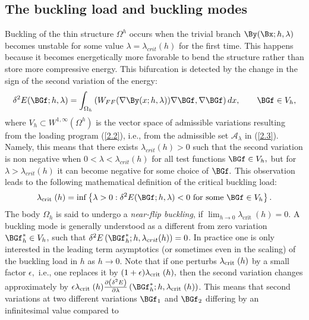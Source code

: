 \subsection{The buckling load and buckling modes}


Buckling of the thin structure $\Omega^h$ occurs when the trivial branch $\By(\Bx ; h, \lambda)$ becomes unstable for some value $\lambda=\lambda_{crit}(h)$ for the first time. This happens because it becomes energetically more favorable to bend the structure rather than store more compressive energy. This bifurcation is detected by the change in the sign of the second variation of the energy:
\begin{equation}
\label{2.6}
\delta^{2}E(\BGf ; h, \lambda)=\int_{\Omega_{h}}\left(W_{F F}(\nabla \By(x ; h, \lambda)) \nabla \BGf, \nabla \BGf \right) d x, \qquad \BGf \in V_h,
\end{equation}
where $V_h\subset W^{1,\infty}(\Omega^h)$ is the vector space of admissible variations resulting from the loading program (\ref{2.2}), i.e., from the admissible set 
$\mathcal{A}_\lambda$ in (\ref{2.3}). Namely, this means that there exists $\lambda_{crit}(h)>0$ such that the second variation is non negative when $0<\lambda<\lambda_{crit}(h)$ for all test functions $\BGf  \in V_h,$ but for 
$\lambda>\lambda_{crit}(h)$ it can become negative for some choice of $\BGf.$ This observation leads to the following mathematical definition of the critical buckling load:
\begin{equation}
\label{2.7}
\lambda_{\text {crit }}(h)=\inf \left\{\lambda>0: \delta^{2} E(\BGf ; h, \lambda)<0 \text { for some } \BGf \in V_h\right\}.
\end{equation}
The body $\Omega_h$ is said to undergo a \textit{near-flip buckling}, if $\lim_{h\to 0} \lambda_{\text {crit }}(h)=0.$ A buckling mode is generally understood as a different from zero variation $\BGf^*_h\in V_h$, such that $\delta^{2} E\left(\BGf_{h}^{*}; h, \lambda_{crit}(h)\right)=0$. In practice one is only interested in the leading term asymptotics (or sometimes even in the scaling) of the buckling load in $h$ as $h\to 0.$ Note that if one perturbs $\lambda_{\text {crit }}(h)$ by a small factor $\epsilon,$ i.e., one replaces it by $(1+\epsilon)\lambda_{\text {crit }}(h),$ then the second variation changes approximately by $\epsilon\Gl_{\text {crit }}(h) \frac{\partial\left(\delta^{2} E\right)}{\partial \lambda}\left(\BGf_{h}^* ; h, \lambda_{\text {crit }}(h)\right)$. This means that second variations at two different variations $\BGf_1$ and $\BGf_2$ differing by an infinitesimal value compared to  
